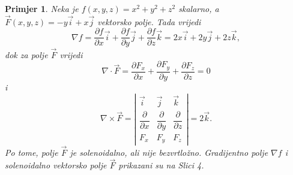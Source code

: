 \documentclass[12pt,a4paper]{article}
\newtheorem{pr}[tm]{Primjer}
\begin{document}
\begin{pr}
Neka je $f(x,y,z)=x^2+y^2+z^2$ skalarno, a 
$\overrightarrow{F}(x,y,z)
=
-y\overrightarrow{i}
+
x\overrightarrow{j}$ vektorsko polje.
Tada vrijedi
$$
\nabla f
= 
\frac{\partial f}{\partial x}\overrightarrow{i}+\frac{\partial f}{\partial y}\overrightarrow{j}+\frac{\partial f}{\partial z}\overrightarrow{k}
=
2x\overrightarrow{i}
+
2y\overrightarrow{j}
+
2z\overrightarrow{k},
$$
dok za polje $\overrightarrow{F}$ vrijedi
$$
\nabla\cdot\overrightarrow{F}=
\frac{\partial F_x}{\partial x}+\frac{\partial F_y}{\partial y}+\frac{\partial F_z}{\partial z}
=
0
$$
i
$$
\nabla\times\overrightarrow{F}=\left|
\begin{array}{ccc}
\overrightarrow{i} & \overrightarrow{j} & \overrightarrow{k} \\[2mm]
\dfrac{\partial}{\partial x} &
\dfrac{\partial}{\partial y} &
\dfrac{\partial}{\partial z} \\[2mm]
F_x & F_y & F_z
\end{array}\right|
=
2\overrightarrow{k}.
$$
Po tome, polje $\overrightarrow{F}$ je solenoidalno, ali nije bezvrtložno. Gradijentno polje $\nabla f$ i solenoidalno vektorsko polje $\overrightarrow{F}$ prikazani su na Slici 4. \end{pr}
\end{document}
